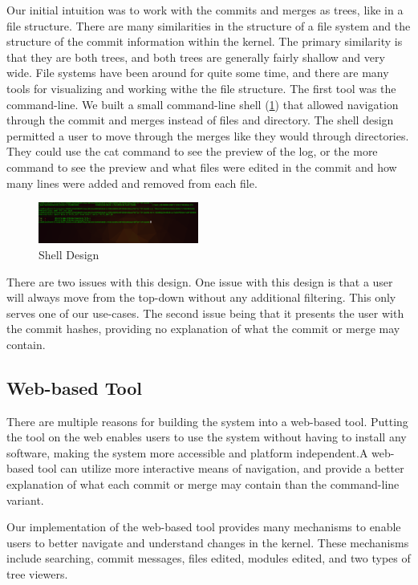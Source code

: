 \documentclass[conference, draftclsnofoot]{IEEEtran}
\begin{document}
Our initial intuition was to work with the commits and merges as trees, like in
a file structure. There are many similarities in the structure of a file system
and the structure of the commit information within the kernel. The primary
similarity is that they are both trees, and both trees are generally fairly
shallow and very wide. File systems have been around for quite some time, and
there are many tools for visualizing and working withe the file structure. The
first tool was the command-line. We built a small command-line shell
(\ref{fig:shell}) that allowed navigation through the commit and merges instead
of files and directory. The shell design permitted a user to move through the
merges like they would through directories. They could use the cat command to
see the preview of the log, or the more command to see the preview and what
files were edited in the commit and how many lines were added and removed from
each file.

\begin{figure}[h]
	\centering
	\includegraphics[width=0.47\textwidth]{figures/shell.png}
	\caption{Shell Design}
	\label{fig:shell}
\end{figure}

There are two issues with this design. One issue with this design is that a
user will always move from the top-down without any additional filtering. This
only serves one of our use-cases. The second issue being that it presents the
user with the commit hashes, providing no explanation of what the commit or
merge may contain.

\subsection{Web-based Tool}

There are multiple reasons for building the system into a web-based tool.
Putting the tool on the web enables users to use the system without having to
install any software, making the system more accessible and platform
independent.A web-based tool can utilize more interactive means of navigation,
and provide a better explanation of what each commit or merge may contain than
the command-line variant.

Our implementation of the web-based tool provides many mechanisms to enable
users to better navigate and understand changes in the kernel. These mechanisms
include searching, commit messages, files edited, modules edited, and two types
of tree viewers.
\end{document}
